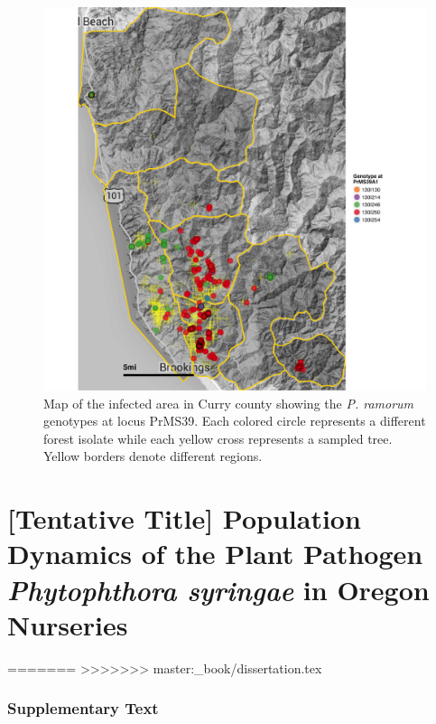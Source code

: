 \documentclass[double,12pt]{beavtex}
\begin{document}
  \begin{figure}
  
  {\centering \includegraphics[width=0.8\linewidth]{figure/phytopathology/figureS10} 
  
  }
  
  \caption[Map of the infected area in Curry county showing the \emph{P. ramorum}
  genotypes at locus PrMS39.]{Map of the infected area in Curry county showing the \emph{P. ramorum}
  genotypes at locus PrMS39. Each colored circle represents a different
  forest isolate while each yellow cross represents a sampled tree. Yellow
  borders denote different regions.}\label{fig:ramS10}
  \end{figure}
  
  \chapter{\texorpdfstring{{[}Tentative Title{]} Population Dynamics of
  the Plant Pathogen \emph{Phytophthora syringae} in Oregon
  Nurseries}{{[}Tentative Title{]} Population Dynamics of the Plant Pathogen Phytophthora syringae in Oregon Nurseries}}\label{tentative-title-population-dynamics-of-the-plant-pathogen-phytophthora-syringae-in-oregon-nurseries}
=======
>>>>>>> master:_book/dissertation.tex
  
  \subsection{Supplementary Text}\label{text:S1}
  
\end{document}
